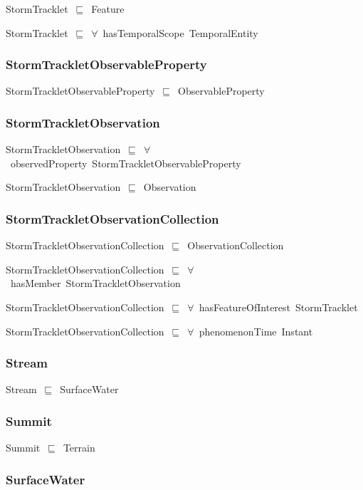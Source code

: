 \documentclass{article}
\begin{document}
StormTracklet~\ensuremath{\sqsubseteq}~Feature~

StormTracklet~\ensuremath{\sqsubseteq}~\ensuremath{\forall}~hasTemporalScope~TemporalEntity~

\subsubsection*{StormTrackletObservableProperty}

StormTrackletObservableProperty~\ensuremath{\sqsubseteq}~ObservableProperty~

\subsubsection*{StormTrackletObservation}

StormTrackletObservation~\ensuremath{\sqsubseteq}~\ensuremath{\forall}~observedProperty~StormTrackletObservableProperty~

StormTrackletObservation~\ensuremath{\sqsubseteq}~Observation~

\subsubsection*{StormTrackletObservationCollection}

StormTrackletObservationCollection~\ensuremath{\sqsubseteq}~ObservationCollection~

StormTrackletObservationCollection~\ensuremath{\sqsubseteq}~\ensuremath{\forall}~hasMember~StormTrackletObservation~

StormTrackletObservationCollection~\ensuremath{\sqsubseteq}~\ensuremath{\forall}~hasFeatureOfInterest~StormTracklet~

StormTrackletObservationCollection~\ensuremath{\sqsubseteq}~\ensuremath{\forall}~phenomenonTime~Instant~

\subsubsection*{Stream}

Stream~\ensuremath{\sqsubseteq}~SurfaceWater~

\subsubsection*{Summit}

Summit~\ensuremath{\sqsubseteq}~Terrain~

\subsubsection*{SurfaceWater}
\end{document}
